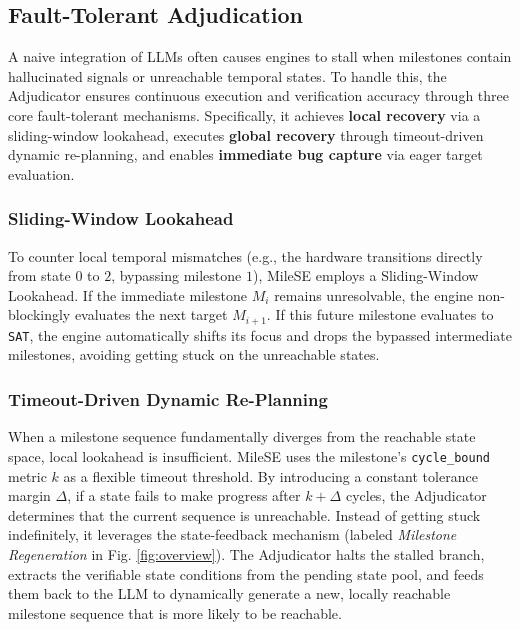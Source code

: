 \documentclass[conference]{IEEEtran}
\begin{document}
\subsection{Fault-Tolerant Adjudication}

A naive integration of LLMs often causes engines to stall when milestones contain hallucinated signals or unreachable temporal states. To handle this, the Adjudicator ensures continuous execution and verification accuracy through three core fault-tolerant mechanisms. Specifically, it achieves \textbf{local recovery} via a sliding-window lookahead, executes \textbf{global recovery} through timeout-driven dynamic re-planning, and enables \textbf{immediate bug capture} via eager target evaluation.

\subsubsection{Sliding-Window Lookahead}
To counter local temporal mismatches (e.g., the hardware transitions directly from state $0$ to $2$, bypassing milestone $1$), MileSE employs a Sliding-Window Lookahead. If the immediate milestone $M_{i}$ remains unresolvable, the engine non-blockingly evaluates the next target $M_{i+1}$. If this future milestone evaluates to \texttt{SAT}, the engine automatically shifts its focus and drops the bypassed intermediate milestones, avoiding getting stuck on the unreachable states.

\subsubsection{Timeout-Driven Dynamic Re-Planning}
When a milestone sequence fundamentally diverges from the reachable state space, local lookahead is insufficient. MileSE uses the milestone's \texttt{cycle\_bound} metric $k$ as a flexible timeout threshold. By introducing a constant tolerance margin $\Delta$, if a state fails to make progress after $k + \Delta$ cycles, the Adjudicator determines that the current sequence is unreachable. Instead of getting stuck indefinitely, it leverages the state-feedback mechanism (labeled \textit{Milestone Regeneration} in Fig. \ref{fig:overview}). The Adjudicator halts the stalled branch, extracts the verifiable state conditions from the pending state pool, and feeds them back to the LLM to dynamically generate a new, locally reachable milestone sequence that is more likely to be reachable.
\end{document}
